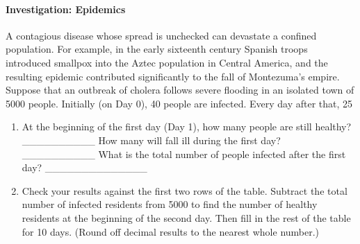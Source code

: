 \documentclass[10pt,]{book}
\theoremstyle{plain}
\theoremstyle{definition}
\theoremstyle{definition}
\theoremstyle{definition}
\theoremstyle{definition}
\theoremstyle{definition}
\numberwithin{equation}{section}
\newcommand{\hrulethin}  {\noalign{\hrule height 0.04em}}
\newcommand{\hrulethick} {\noalign{\hrule height 0.11em}}
\newcounter{figstack}
\newlength\fight
\newcommand\pushValignCaptionBottom[5][b]{%
\stepcounter{figstack}%
\expandafter\def\csname %
figalign\romannumeral\value{figstack}\endcsname{#1}%
\expandafter\def\csname %
figtype\romannumeral\value{figstack}\endcsname{#2}%
\expandafter\def\csname %
figwd\romannumeral\value{figstack}\endcsname{#3}%
\expandafter\def\csname %
figcontent\romannumeral\value{figstack}\endcsname{#4}%
\expandafter\def\csname %
figcap\romannumeral\value{figstack}\endcsname{#5}%
\setbox0=\hbox{%
\begin{#2}{#3}#4\end{#2}}%
\ifdim\dimexpr\ht0+\dp0\relax>\fight\global\setlength{\fight}{%
\dimexpr\ht0+\dp0\relax}\fi%
}
\begin{document}
\paragraph[Investigation: Epidemics]{Investigation: Epidemics}\label{paragraphs-19}

            A contagious disease whose spread is unchecked can devastate a confined population. For example, in the early sixteenth century Spanish troops introduced smallpox into the Aztec population in Central America, and the resulting epidemic contributed significantly to the fall of Montezuma’s empire. Suppose that an outbreak of cholera follows severe flooding in an isolated town of 5000 people. Initially (on Day 0), 40 people are infected. Every day after that, 25%
\leavevmode%
\begin{enumerate}
\item\hypertarget{li-218}{}At the beginning of the first day (Day 1), how many people are still healthy? __________ How many will fall ill during the first day? __________ What is the total number of people infected after the first day? ______________ 
\item\hypertarget{li-219}{}Check your results against the first two rows of the table. Subtract the total number of infected residents from 5000 to find the number of healthy residents at the beginning of the second day. Then fill in the rest of the table for 10 days. (Round off decimal results to the nearest whole number.)
\leavevmode%
\end{enumerate}
\end{document}
